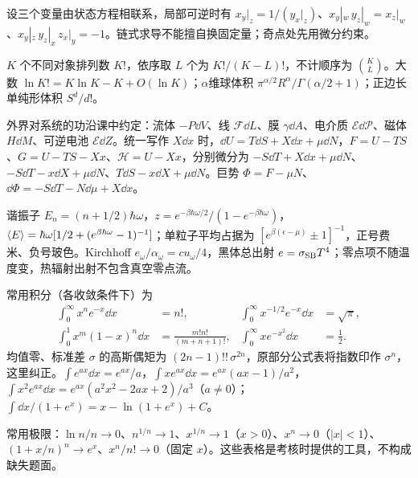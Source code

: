 设三个变量由状态方程相联系，局部可逆时有 $x_y|_z=1/(y_x|_z)$、$x_y|_w\,y_z|_w=x_z|_w$、$x_y|_z\,y_z|_x\,z_x|_y=-1$。链式求导不能擅自换固定量；奇点处先用微分约束。

$K$ 个不同对象排列数 $K!$，依序取 $L$ 个为 $K!/(K-L)!$，不计顺序为 $\binom KL$。大数 $\ln K!=K\ln K-K+O(\ln K)$；$\alpha$维球体积 $\pi^{\alpha/2}R^\alpha/\Gamma(\alpha/2+1)$；正边长单纯形体积 $S^d/d!$。

外界对系统的功沿课中约定：流体 $-P\dd V$、线 $\mathcal F\dd L$、膜 $\gamma\dd A$、电介质 $\mathcal E\dd\mathcal P$、磁体 $H\dd M$、可逆电池 $\mathcal E\dd Z$。统一写作 $X\dd x$ 时，$\dd U=T\dd S+X\dd x+\mu\dd N$，$F=U-TS$、$G=U-TS-Xx$、$\mathcal H=U-Xx$，分别微分为 $-S\dd T+X\dd x+\mu\dd N$、$-S\dd T-x\dd X+\mu\dd N$、$T\dd S-x\dd X+\mu\dd N$。巨势 $\Phi=F-\mu N$、$\dd\Phi=-S\dd T-N\dd\mu+X\dd x$。

谐振子 $E_n=(n+1/2)\hbar\omega$，$z=e^{-\beta\hbar\omega/2}/(1-e^{-\beta\hbar\omega})$，$\langle E\rangle=\hbar\omega[1/2+(e^{\beta\hbar\omega}-1)^{-1}]$；单粒子平均占据为 $[e^{\beta(\epsilon-\mu)}\pm1]^{-1}$，正号费米、负号玻色。Kirchhoff $e_\omega/\alpha_\omega=cu_\omega/4$，黑体总出射 $e=\sigma_{\rm SB}T^4$；零点项不随温度变，热辐射出射不包含真空零点流。

常用积分（各收敛条件下）为
\begin{align*}
\int_0^\infty x^ne^{-x}\dd x&=n!,&\int_0^\infty x^{-1/2}e^{-x}\dd x&=\sqrt\pi,\\
\int_0^1x^m(1-x)^n\dd x&=\frac{m!n!}{(m+n+1)!},&\int_0^\infty xe^{-x^2}\dd x&=\frac12.
\end{align*}
均值零、标准差 $\sigma$ 的高斯偶矩为 $(2n-1)!!\,\sigma^{2n}$，原部分公式表将指数印作 $\sigma^n$，这里纠正。$\int e^{ax}\dd x=e^{ax}/a$，$\int xe^{ax}\dd x=e^{ax}(ax-1)/a^2$，$\int x^2e^{ax}\dd x=e^{ax}(a^2x^2-2ax+2)/a^3$（$a\ne0$）；$\int\dd x/(1+e^x)=x-\ln(1+e^x)+C$。

常用极限：$\ln n/n\to0$、$n^{1/n}\to1$、$x^{1/n}\to1$（$x>0$）、$x^n\to0$（$|x|<1$）、$(1+x/n)^n\to e^x$、$x^n/n!\to0$（固定 $x$）。这些表格是考核时提供的工具，不构成缺失题面。

